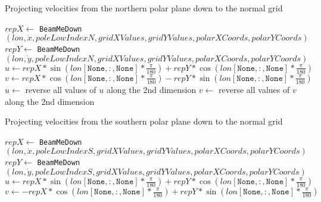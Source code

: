 \begin{algorithm}[htb]
    \caption{Projecting velocities from the northern polar plane down to the normal grid}
    \label{alg:project velocities north}
    $repX \leftarrow $ \texttt{BeamMeDown}$(lon, \dot{x}, poleLowIndexN, gridXValues, gridYValues, polarXCoords, polarYCoords)$ \;
    $repY \leftarrow $ \texttt{BeamMeDown}$(lon, \dot{y}, poleLowIndexN, gridXValues, gridYValues, polarXCoords, polarYCoords)$ \;
    $u \leftarrow repX * \sin(lon[\texttt{None}, :, \texttt{None}] * \frac{\pi}{180}) + repY * \cos(lon[\texttt{None}, :, \texttt{None}] * \frac{\pi}{180})$ \;
    $v \leftarrow repX * \cos(lon[\texttt{None}, :, \texttt{None}] * \frac{\pi}{180}) - repY * \sin(lon[\texttt{None}, :, \texttt{None}] * \frac{\pi}{180})$ \;
    $u \leftarrow $ reverse all values of $u$ along the 2nd dimension \;
    $v \leftarrow $ reverse all values of $v$ along the 2nd dimension \;
\end{algorithm}

\begin{algorithm}[htb]
    \caption{Projecting velocities from the southern polar plane down to the normal grid}
    \label{alg:project velocities south}
    $repX \leftarrow $ \texttt{BeamMeDown}$(lon, \dot{x}, poleLowIndexS, gridXValues, gridYValues, polarXCoords, polarYCoords)$ \;
    $repY \leftarrow $ \texttt{BeamMeDown}$(lon, \dot{y}, poleLowIndexS, gridXValues, gridYValues, polarXCoords, polarYCoords)$ \;
    $u \leftarrow repX * \sin(lon[\texttt{None}, :, \texttt{None}] * \frac{\pi}{180}) + repY * \cos(lon[\texttt{None}, :, \texttt{None}] * \frac{\pi}{180})$ \;
    $v \leftarrow -repX * \cos(lon[\texttt{None}, :, \texttt{None}] * \frac{\pi}{180}) + repY * \sin(lon[\texttt{None}, :, \texttt{None}] * \frac{\pi}{180})$ \;
\end{algorithm}

